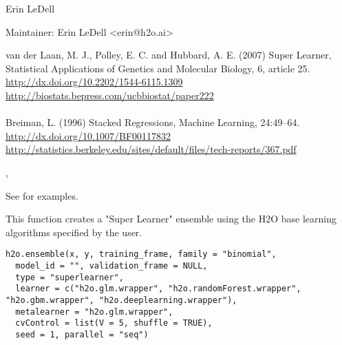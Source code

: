 \documentclass[a4paper]{book}
\begin{document}
%
\begin{Author}\relax
Erin LeDell

Maintainer: Erin LeDell <erin@h2o.ai>
\end{Author}
%
\begin{References}\relax
van der Laan, M. J., Polley, E. C. and Hubbard, A. E. (2007) Super Learner, Statistical Applications of Genetics and Molecular Biology, 6, article 25. \\{}
\url{http://dx.doi.org/10.2202/1544-6115.1309}\\{}
\url{http://biostats.bepress.com/ucbbiostat/paper222}\\{}
\\{}
Breiman, L. (1996) Stacked Regressions, Machine Learning, 24:49–64.\\{}
\url{http://dx.doi.org/10.1007/BF00117832}\\{}
\url{http://statistics.berkeley.edu/sites/default/files/tech-reports/367.pdf}
\end{References}
%
\begin{SeeAlso}\relax
{}, 
\end{SeeAlso}
%
\begin{Examples}
\begin{ExampleCode}
See  for examples.
\end{ExampleCode}
\end{Examples}
%
\begin{Description}\relax
This function creates a "Super Learner" ensemble using the H2O base learning algorithms specified by the user.
\end{Description}
%
\begin{Usage}
\begin{verbatim}
h2o.ensemble(x, y, training_frame, family = "binomial", 
  model_id = "", validation_frame = NULL,
  type = "superlearner",
  learner = c("h2o.glm.wrapper", "h2o.randomForest.wrapper", "h2o.gbm.wrapper", "h2o.deeplearning.wrapper"), 
  metalearner = "h2o.glm.wrapper", 
  cvControl = list(V = 5, shuffle = TRUE), 
  seed = 1, parallel = "seq")
\end{verbatim}
\end{Usage}
%
\end{document}
